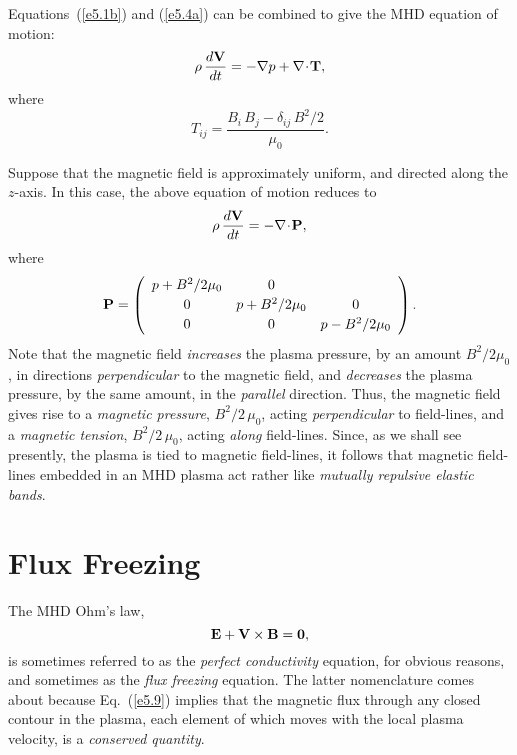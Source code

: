 Equations~(\ref{e5.1b}) and (\ref{e5.4a}) can be combined to give the MHD equation
of motion:
\begin{equation}
\rho\,\frac{d{\bf V}}{dt} = -\nabla p + \nabla\!\cdot\!{\bf T},
\end{equation}
where
\begin{equation}
T_{ij} = \frac{B_i\,B_j- \delta_{ij} \,B^2/2}{\mu_0}.
\end{equation}

Suppose that the magnetic field is approximately uniform, and
directed along the $z$-axis. In this case, the above equation of
motion reduces to
\begin{equation}
\rho\,\frac{d{\bf V}}{dt} = -\nabla\!\cdot\!{\bf P},
\end{equation}
where
\begin{equation}
{\bf P} = \left(\begin{array}{ccc}
p + B^2/2\mu_0 & 0\\[0.5ex]
0 &p + B^2/2\mu_0& 0\\[0.5ex]
0&0& p - B^2/2\mu_0\end{array}
\right).
\end{equation}
Note that the magnetic field {\em increases}\/ the plasma pressure, by an
amount $B^2/2\mu_0$, in directions {\em perpendicular}\/ to the magnetic field,
and {\em decreases}\/ the plasma pressure, by the same amount, in the
{\em parallel}\/ direction. Thus, the magnetic field gives rise to
a {\em magnetic pressure}, $B^2/2\,\mu_0$, acting {\em perpendicular}\/ to field-lines,
and a {\em magnetic tension}, $B^2/2\,\mu_0$, acting 
{\em along}\/ field-lines. 
Since, as we shall see presently, the plasma is tied to magnetic field-lines, 
it follows that magnetic field-lines embedded in an
MHD plasma  act rather like
{\em mutually repulsive elastic bands}. 

\section{Flux Freezing}\label{s5.3}
The MHD Ohm's law,
\begin{equation}\label{e5.9}
{\bf E} + {\bf V}\times {\bf B} = {\bf 0},
\end{equation}
is sometimes referred to as the {\em perfect conductivity}\/ equation, for
obvious reasons, and sometimes as the {\em flux freezing}\/ equation. 
The latter nomenclature comes about because Eq.~(\ref{e5.9}) implies that the magnetic
flux  through any closed contour in the plasma, each element of
which moves with the local plasma velocity, is a {\em conserved quantity}. 

